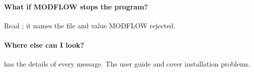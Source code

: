 \paragraph{What if MODFLOW stops the program?} Read ; it names the file and value MODFLOW
rejected.
\paragraph{Where else can I look?}  has the details of every message. The user guide
 and  cover installation problems.
